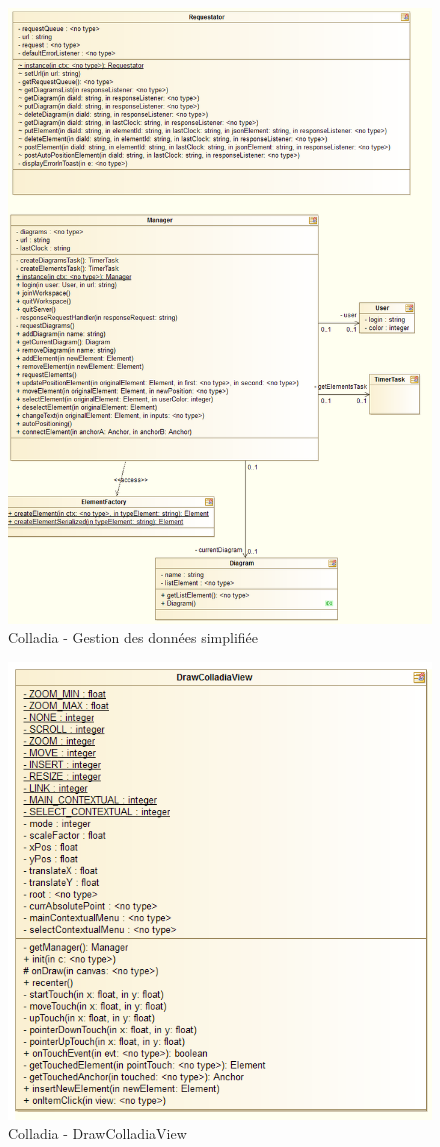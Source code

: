 \newpage
	\begin{figure}[!h]
		\centering
		\includegraphics[width=.9\textwidth]{img/UmlArchiGeneral}
		\caption{Colladia - Gestion des données simplifiée}
	\end{figure}

\newpage
	\begin{figure}[!h]
		\centering
		\includegraphics[width=.8\textwidth]{img/UmlDrawView}
		\caption{Colladia - DrawColladiaView}
	\end{figure}

